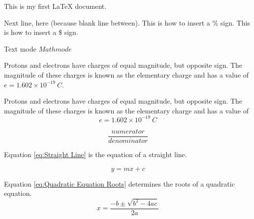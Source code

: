 \documentclass[12pt]{report} %
\begin{document}
This is my first LaTeX document.

Next line, here (because blank line between).
This is how to insert a \% sign.
This is how to insert a \$ sign.

\lipsum

Text mode
$Math mode$

Protons and electrons have charges of equal magnitude, but opposite sign. The magnitude of these charges is known as the elementary charge and has a value of $e=1.602\times 10^{-19}\ C$.

Protons and electrons have charges of equal magnitude, but opposite sign. The magnitude of these charges is known as the elementary charge and has a value of $$e=1.602\times 10^{-19}\ C$$

$$\frac{numerator}{denominator}$$

Equation \ref{eq:Straight Line} is the equation of a straight line.

\begin{equation} \label{eq:Straight Line}
y=mx+c
\end{equation}

Equation \ref{eq:Quadratic Equation Roots} determines the roots of a quadratic equation.
\begin{equation} \label{eq:Quadratic Equation Roots}
x=\frac{-b\pm \sqrt{b^2-4ac}}{2a}
\end{equation}
\end{document}
